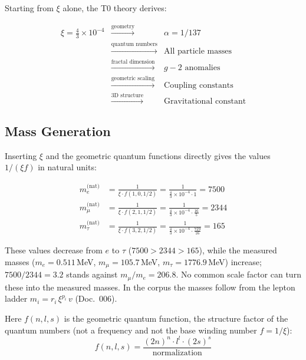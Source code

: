	Starting from $\xi$ alone, the T0 theory derives:
	
	\begin{equation}
		\begin{array}{rcl}
			\xi = \frac{4}{3} \times 10^{-4} & \xrightarrow{\text{geometry}} & \alpha = 1/137\\
			& \xrightarrow{\text{quantum numbers}} & \text{All particle masses}\\
			& \xrightarrow{\text{fractal dimension}} & g-2 \text{ anomalies}\\
			& \xrightarrow{\text{geometric scaling}} & \text{Coupling constants}\\
			& \xrightarrow{\text{3D structure}} & \text{Gravitational constant}
		\end{array}
	\end{equation}
	
	\subsection{Mass Generation}
	
	Inserting $\xi$ and the geometric quantum functions directly gives the values $1/(\xi f)$ in natural units:
	
	\begin{align}
		m_e^{\text{(nat)}} &= \frac{1}{\xi \cdot f(1,0,1/2)} = \frac{1}{\frac{4}{3} \times 10^{-4} \cdot 1} = 7500 \\
		m_\mu^{\text{(nat)}} &= \frac{1}{\xi \cdot f(2,1,1/2)} = \frac{1}{\frac{4}{3} \times 10^{-4} \cdot \frac{16}{5}} = 2344 \\
		m_\tau^{\text{(nat)}} &= \frac{1}{\xi \cdot f(3,2,1/2)} = \frac{1}{\frac{4}{3} \times 10^{-4} \cdot \frac{729}{16}} = 165
	\end{align}
	
	These values decrease from $e$ to $\tau$ ($7500 > 2344 > 165$), while the measured masses ($m_e = 0.511$\,MeV, $m_\mu = 105.7$\,MeV, $m_\tau = 1776.9$\,MeV) increase; $7500/2344 = 3.2$ stands against $m_\mu/m_e = 206.8$. No common scale factor can turn these into the measured masses. In the corpus the masses follow from the lepton ladder $m_i = r_i\,\xi^{p_i}\,v$ (Doc.~006).
	
	Here $f(n,l,s)$ is the geometric quantum function, the structure factor of the quantum numbers (not a frequency and not the base winding number $f = 1/\xi$):
	\begin{equation}
		f(n,l,s) = \frac{(2n)^n \cdot l^l \cdot (2s)^s}{\text{normalization}}
	\end{equation}
	
